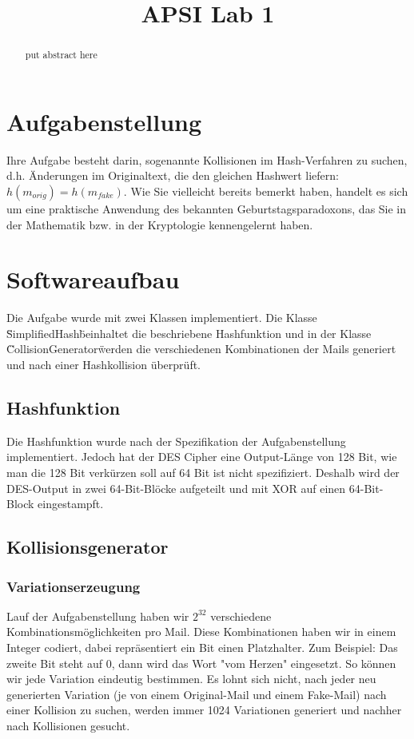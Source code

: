 \documentclass[12pt]{scrartcl}
\title{ %
APSI Lab 1
\vspace{0.2cm}
}
\begin{document}
 \maketitle
 \thispagestyle{firststyle}
 \pagestyle{firststyle}
 \begin{abstract}
 \begin{center}
  put abstract here  
 \end{center}
 \vspace{0.5cm}
\hrulefill
\end{abstract}

 \pagestyle{documentstyle}
 \tableofcontents
 \pagebreak
\section{Aufgabenstellung}
Ihre Aufgabe besteht darin, sogenannte Kollisionen im Hash-Verfahren zu suchen, d.h. Änderungen
im Originaltext, die den gleichen Hashwert liefern: $ h(m_{orig}) = h(m_{fake})$. Wie Sie vielleicht
bereits bemerkt haben, handelt es sich um eine praktische Anwendung des bekannten
Geburtstagsparadoxons, das Sie in der Mathematik bzw. in der Kryptologie kennengelernt
haben.

\section{Softwareaufbau}
Die Aufgabe wurde mit zwei Klassen implementiert. Die Klasse \"SimplifiedHash\" beinhaltet die beschriebene Hashfunktion und in der Klasse \"CollisionGenerator\" werden die verschiedenen Kombinationen der Mails generiert und nach einer Hashkollision überprüft.

\subsection{Hashfunktion}
Die Hashfunktion wurde nach der Spezifikation der Aufgabenstellung implementiert. Jedoch hat der DES Cipher eine Output-Länge von  128 Bit, wie man die 128 Bit verkürzen soll auf 64 Bit ist nicht spezifiziert. Deshalb wird der DES-Output in zwei 64-Bit-Blöcke aufgeteilt und mit XOR auf einen 64-Bit-Block eingestampft.

\subsection{Kollisionsgenerator}
\subsubsection{Variationserzeugung}
Lauf der Aufgabenstellung haben wir $2^{32}$ verschiedene Kombinationsmöglichkeiten pro Mail. Diese Kombinationen haben wir in einem Integer codiert, dabei repräsentiert ein Bit einen Platzhalter.   Zum Beispiel: Das zweite Bit steht auf 0, dann wird das Wort "vom Herzen" eingesetzt. So können wir jede Variation eindeutig bestimmen.
Es lohnt sich nicht, nach jeder neu generierten Variation (je von einem Original-Mail und einem Fake-Mail) nach einer Kollision zu suchen, werden immer 1024 Variationen generiert und nachher nach Kollisionen gesucht.
\end{document}
